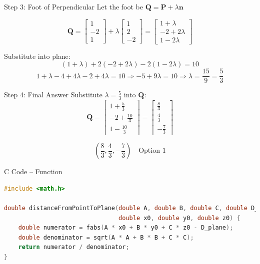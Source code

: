\documentclass{beamer}
\begin{document}
\begin{frame}{Step 3: Foot of Perpendicular}
Let the foot be \( \mathbf{Q} = \mathbf{P} + \lambda \mathbf{n} \)

\begin{equation}
\mathbf{Q} = \begin{bmatrix} 1 \\ -2 \\ 1 \end{bmatrix} + \lambda \begin{bmatrix} 1 \\ 2 \\ -2 \end{bmatrix} 
= \begin{bmatrix} 1 + \lambda \\ -2 + 2\lambda \\ 1 - 2\lambda \end{bmatrix}
\end{equation}

Substitute into plane:
\[
(1 + \lambda) + 2(-2 + 2\lambda) - 2(1 - 2\lambda) = 10
\]
\[
1 + \lambda - 4 + 4\lambda - 2 + 4\lambda = 10
\Rightarrow -5 + 9\lambda = 10
\Rightarrow \lambda = \frac{15}{9} = \frac{5}{3}
\]
\end{frame}

\begin{frame}{Step 4: Final Answer}
Substitute \( \lambda = \frac{5}{3} \) into \( \mathbf{Q} \):
\begin{equation}
\mathbf{Q} = \begin{bmatrix} 1 + \frac{5}{3} \\ -2 + \frac{10}{3} \\ 1 - \frac{10}{3} \end{bmatrix}
= \begin{bmatrix} \frac{8}{3} \\ \frac{4}{3} \\ -\frac{7}{3} \end{bmatrix}
\end{equation}

\[
\boxed{
\left( \frac{8}{3}, \frac{4}{3}, -\frac{7}{3} \right)
}
\quad \text{Option 1}
\]
\end{frame}

\begin{frame}[fragile]{C Code – Function}
\begin{lstlisting}[language=C]
#include <math.h>

double distanceFromPointToPlane(double A, double B, double C, double D_plane,
                                double x0, double y0, double z0) {
    double numerator = fabs(A * x0 + B * y0 + C * z0 - D_plane);
    double denominator = sqrt(A * A + B * B + C * C);
    return numerator / denominator;
}
\end{lstlisting}
\end{frame}
\end{document}

